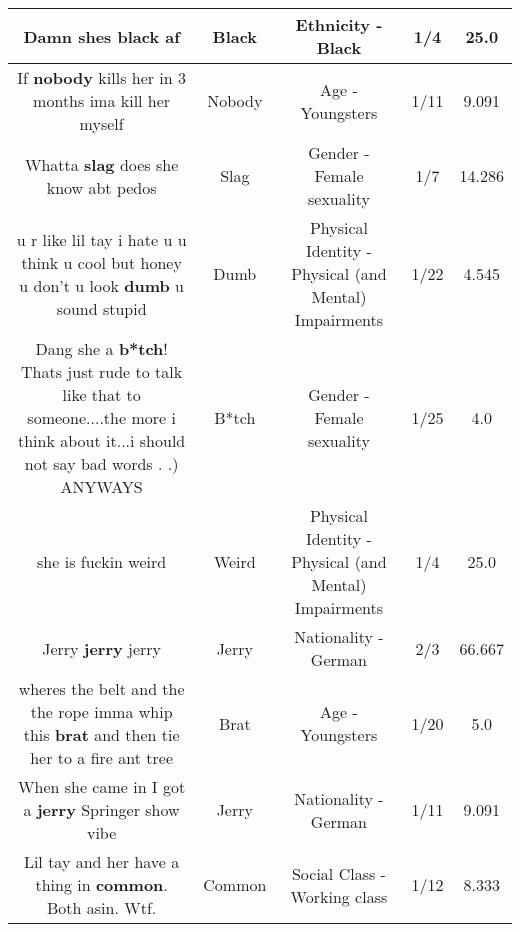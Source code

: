 \documentclass[11pt]{article}
\newlength\mylength
\begin{document}
\begin{center}
\begin{longtable}{|C{.65\mylength}|C{.30\mylength}|C{.12\mylength}|C{.12\mylength}|C{.12\mylength}|}
  \small Damn shes \textbf{black} af\normalsize   & Black & Ethnicity - Black & 1/4 & 25.0 \\  \hline
  \small If \textbf{nobody} kills her in 3 months ima kill her myself\normalsize   & Nobody & Age - Youngsters & 1/11 & 9.091 \\  \hline
  \small Whatta \textbf{slag} does she know abt pedos\normalsize   & Slag & Gender - Female sexuality & 1/7 & 14.286 \\  \hline
  \small u r like lil tay i hate u u think u cool but honey u don't u look \textbf{dumb} u sound stupid\normalsize   & Dumb & Physical Identity - Physical (and Mental) Impairments & 1/22 & 4.545 \\  \hline
  \small Dang she a \textbf{b*tch}! Thats just rude to talk like that to someone....the more i think about it...i should not say bad words . .) ANYWAYS\normalsize   & B*tch & Gender - Female sexuality & 1/25 & 4.0 \\  \hline
  \small she is fuckin weird\normalsize   & Weird & Physical Identity - Physical (and Mental) Impairments & 1/4 & 25.0 \\  \hline
  \small Jerry \textbf{jerry} jerry\normalsize   & Jerry & Nationality - German & 2/3 & 66.667 \\  \hline
  \small wheres the belt and the the rope imma whip this \textbf{brat} and then tie her to a fire ant tree\normalsize   & Brat & Age - Youngsters & 1/20 & 5.0 \\  \hline
  \small When she came in I got a \textbf{jerry} Springer show vibe\normalsize   & Jerry & Nationality - German & 1/11 & 9.091 \\  \hline
  \small Lil tay and her have a thing in \textbf{common}. Both asin. Wtf.\normalsize   & Common & Social Class - Working class & 1/12 & 8.333 \\  \hline

\end{longtable}
\end{center}
\end{document}
